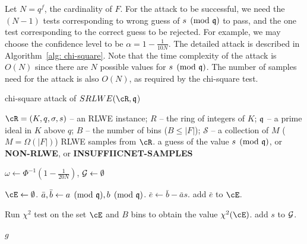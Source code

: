 \documentclass{amsart}
\begin{document}
Let $N = q^f$,  the cardinality of $F$. For the attack to be successful, we need the $(N-1)$ tests corresponding to wrong guess of $s \pmod{\mathfrak{q}}$ to pass, and the one test corresponding to the correct guess to be rejected. For example, we may choose the confidence level to be  $\alpha = 1 - \frac{1}{10N}$. The detailed attack is described in Algorithm~\ref{alg: chi-square}. Note that the time complexity of the attack is $O(N)$ since there are $N$ possible values for $s \pmod {\mathfrak{q}}$. The number of samples need for the attack is also $O(N)$, as required by the chi-square test.



\begin{algorithm}[H] \label{alg: chi-square}
\caption{chi-square attack of $SRLWE(\cR,\fq$)}          %
\label{IPR}                           %
\begin{algorithmic}[1]              %
     \Require

     $\cR = (K,q,\sigma, s)$ -- an RLWE instance; $R$ -- the ring of integers of $K$; $\mathfrak{q}$ -- a prime ideal in $K$ above $q$; $B$ -- the number of bins ($B \leq |F|$); $\mathcal{S}$ -- a collection of $M$ ($M = \Omega(|F|)$) RLWE samples from $\cR$.
    \Ensure a guess of the value $s \pmod{\mathfrak{q}}$, or {\bf NON-RLWE}, or {\bf INSUFFIICNET-SAMPLES}

    \State $\omega \gets \Phi^{-1}(1- \frac{1}{20N})$, $\mathcal{G} \gets \emptyset$

        \State $\cE \gets \emptyset$.
            \State $\bar{a}, \bar{b} \gets a \pmod{\mathfrak{q}}, b \pmod{\mathfrak{q}}$.
            \State $\bar{e} \gets \bar{b} - \bar{a}s$.
            \State add $\bar{e}$ to $\cE$.
        \EndFor

        \State Run $\chi^2$ test on the set $\cE$ and $B$ bins to obtain the value $\chi^2(\cE)$.
            \State add $s$ to $\mathcal{G}$.
        \EndIf
    \EndFor


        \Return $g$
    \Else
    \EndIf

\end{algorithmic}
\end{algorithm}
\end{document}

